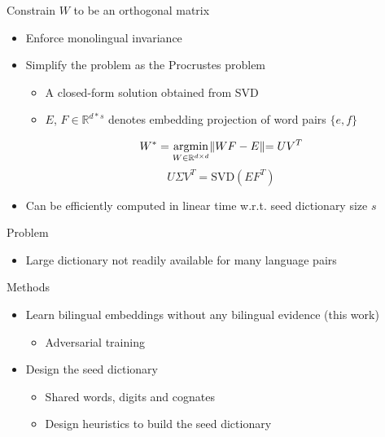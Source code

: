 \documentclass[11pt, a4paper, landscape]{article}
\newcommand*{\argmin}{\ensuremath{\operatornamewithlimits{argmin}}\xspace}
\begin{document}
	\NewPage
	\vfill
	Constrain ${W}$ to be an orthogonal matrix
	\begin{itemize}
		\item Enforce monolingual invariance
		
		\item Simplify the problem as the Procrustes problem
		
		\begin{itemize}
			\item A closed-form solution obtained from SVD
			\item $E$, $F \in \mathbb{R}^{d*s}$ denotes embedding projection of word pairs ${\{e,f\}}$
		\end{itemize}
		
		\[ W^* = \argmin\limits_{W \in \mathbb{R}^{d \times d}} \lVert WF-E\lVert  =  UV^T\]
		\[ U\varSigma V^T =  \textrm{SVD}(EF^T)\]
		
		\item Can be efficiently computed in linear time  w.r.t. seed dictionary size $s$
	\end{itemize}
	\vfill
	\NewPage
	\vfill
	Problem
	\begin{itemize}
		\item Large dictionary not readily available for many language pairs\\
	\end{itemize}
	
	
	Methods
	\begin{itemize}
		\item 	Learn bilingual embeddings without any bilingual evidence (this work)
		\begin{itemize}
			\item Adversarial training			
		\end{itemize}
		\item Design the seed dictionary
		\begin{itemize}
			\item Shared words, digits and cognates
			\item Design heuristics to
			build the seed dictionary
		\end{itemize}
		
	\end{itemize}
	\vfill
	
\end{document}
